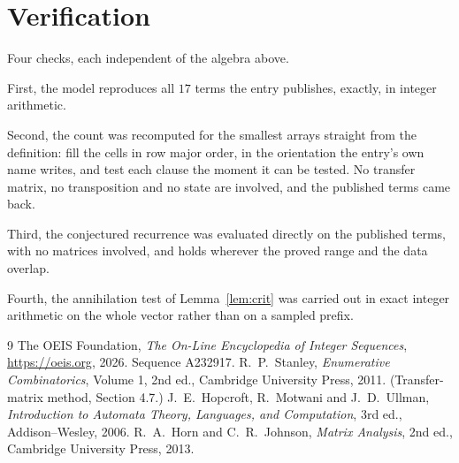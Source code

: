 \documentclass[11pt,a4paper]{article}
\theoremstyle{plain}
\theoremstyle{definition}
\begin{document}
\section{Verification}

Four checks, each independent of the algebra above.

First, the model reproduces all $17$ terms the entry publishes, exactly, in integer
arithmetic.

Second, the count was recomputed for the smallest arrays straight from the definition: fill the
cells in row major order, in the orientation the entry's own name writes, and test each clause
the moment it can be tested. No transfer matrix, no transposition and no state are involved,
and the published terms came back.

Third, the conjectured recurrence was evaluated directly on the published terms, with no
matrices involved, and holds wherever the proved range and the data overlap.

Fourth, the annihilation test of Lemma~\ref{lem:crit} was carried out in exact integer
arithmetic on the whole vector rather than on a sampled prefix.

\begin{thebibliography}{9}
 The OEIS Foundation, \emph{The On-Line Encyclopedia of Integer
Sequences}, \url{https://oeis.org}, 2026. Sequence A232917.
 R.~P.~Stanley, \emph{Enumerative Combinatorics}, Volume 1, 2nd ed.,
Cambridge University Press, 2011. (Transfer-matrix method, Section 4.7.)
 J.~E.~Hopcroft, R.~Motwani and J.~D.~Ullman, \emph{Introduction to Automata
Theory, Languages, and Computation}, 3rd ed., Addison--Wesley, 2006.
 R.~A.~Horn and C.~R.~Johnson, \emph{Matrix Analysis}, 2nd ed., Cambridge
University Press, 2013.
\end{thebibliography}
\end{document}
